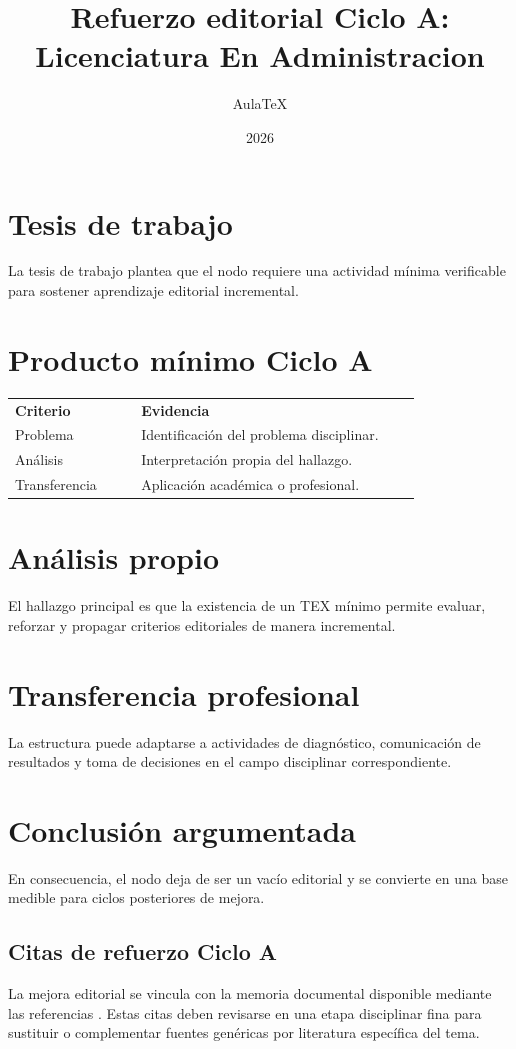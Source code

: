 \documentclass[12pt]{article}
\title{Refuerzo editorial Ciclo A: Licenciatura En Administracion}
\author{AulaTeX}
\date{2026}
\begin{document}
\maketitle
\section*{Tesis de trabajo}
La tesis de trabajo plantea que el nodo requiere una actividad mínima verificable para sostener aprendizaje editorial incremental.
\section*{Producto mínimo Ciclo A}
\begin{center}
\begin{tabular}{p{0.28\linewidth}p{0.62\linewidth}}
\textbf{Criterio} & \textbf{Evidencia}\\
Problema & Identificación del problema disciplinar.\\
Análisis & Interpretación propia del hallazgo.\\
Transferencia & Aplicación académica o profesional.\\
\end{tabular}
\end{center}
\section*{Análisis propio}
El hallazgo principal es que la existencia de un TEX mínimo permite evaluar, reforzar y propagar criterios editoriales de manera incremental.
\section*{Transferencia profesional}
La estructura puede adaptarse a actividades de diagnóstico, comunicación de resultados y toma de decisiones en el campo disciplinar correspondiente.
\section*{Conclusión argumentada}
En consecuencia, el nodo deja de ser un vacío editorial y se convierte en una base medible para ciclos posteriores de mejora.



\subsection*{Citas de refuerzo Ciclo A}
La mejora editorial se vincula con la memoria documental disponible mediante las referencias \citep{cicloARefuerzo01,cicloARefuerzo02,cicloARefuerzo03,cicloARefuerzo04,cicloARefuerzo05,cicloARefuerzo06}. Estas citas deben revisarse en una etapa disciplinar fina para sustituir o complementar fuentes genéricas por literatura específica del tema.
\end{document}

